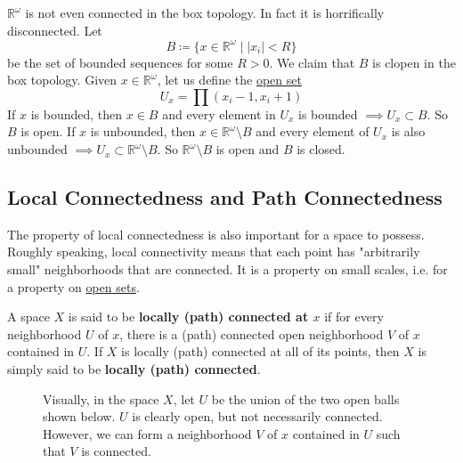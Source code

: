   \begin{example}
    \label{ex:romega-is-disconnected-in-the-box-topology}
    $\mathbb{R}^\omega$ is not even connected in the box topology. In fact it is horrifically disconnected. Let 
    \begin{equation}
      B \coloneqq \{x \in \mathbb{R}^\omega \mid |x_i| < R\}
    \end{equation}
    be the set of bounded sequences for some $R > 0$. We claim that $B$ is clopen in the box topology. Given $x \in \mathbb{R}^\omega$, let us define the \hyperref[def:open-set]{open set}
    \begin{equation}
      U_x = \prod (x_i - 1, x_i + 1) 
    \end{equation}
    If $x$ is bounded, then $x \in B$ and every element in $U_x$ is bounded $\implies U_x \subset B$. So $B$ is open. If $x$ is unbounded, then $x \in \mathbb{R}^\omega \setminus B$ and every element of $U_x$ is also unbounded $\implies U_x \subset \mathbb{R}^\omega \setminus B$. So $\mathbb{R}^\omega \setminus B$ is open and $B$ is closed. 
  \end{example}

\subsection{Local Connectedness and Path Connectedness}

  The property of local connectedness is also important for a space to possess. Roughly speaking, local connectivity means that each point has "arbitrarily small" neighborhoods that are connected. It is a property on small scales, i.e. for a property on \hyperref[def:open-set]{open sets}. 

  \begin{definition} 
		\label{def:locally_connected}
    A space $X$ is said to be \textbf{locally (path) connected at $x$} if for every neighborhood $U$ of $x$, there is a (path) connected open neighborhood $V$ of $x$ contained in $U$. If $X$ is locally (path) connected at all of its points, then $X$ is simply said to be \textbf{locally (path) connected}. 

    \begin{figure}[H]
      \centering 
      \caption{Visually, in the space $X$, let $U$ be the union of the two open balls shown below. $U$ is clearly open, but not necessarily connected. However, we can form a  neighborhood $V$ of $x$ contained in $U$ such that $V$ is connected. }
      \label{fig:locally_connected}
    \end{figure}
  \end{definition} 

